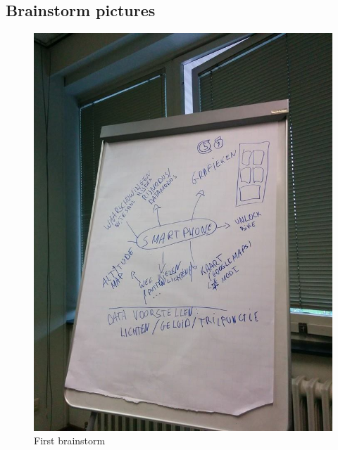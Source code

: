 \subsection{Brainstorm pictures}
\label{subsection:brainstorm-pictures}
\begin{figure}[H]
\center
 \includegraphics[width=\linewidth]{attachments/brainstorm/brainstorm1.jpg}
 \caption{First brainstorm}
 \label{image:ganttchart1}
\end{figure}
